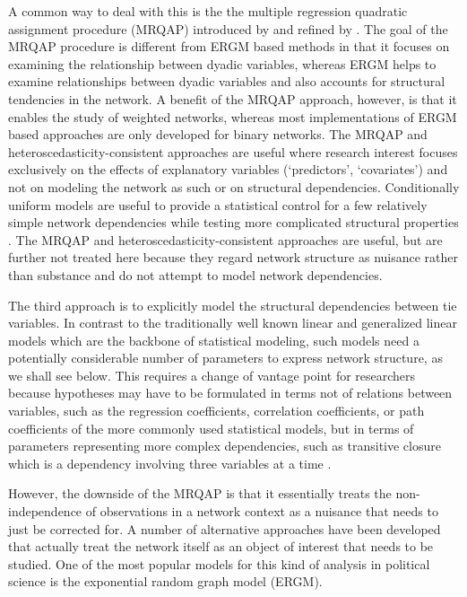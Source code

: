 A common way to deal with this is the the multiple regression quadratic assignment procedure (MRQAP) introduced by \citet{krackhardt:1988} and refined by \citet{dekker:etal:2007}. The goal of the MRQAP procedure is different from ERGM based methods in that it focuses on examining the relationship between dyadic variables, whereas ERGM helps to examine relationships between dyadic variables and also accounts for structural tendencies in the network. A benefit of the MRQAP approach, however, is that it enables the study of weighted networks, whereas most implementations of ERGM based approaches are only developed for binary networks. The MRQAP and heteroscedasticity-consistent approaches are useful where research interest focuses exclusively on the effects of explanatory variables (`predictors', `covariates') and not on modeling the network as such or on structural dependencies. Conditionally uniform models are useful to provide a statistical control for a few relatively simple network dependencies while testing more complicated structural properties \citep{snijders:2011}. The MRQAP and heteroscedasticity-consistent approaches are useful, but are further not treated here because they regard network structure as nuisance rather than substance and do not attempt to model network dependencies. 

The third approach is to explicitly model the structural dependencies between tie variables. In contrast to the traditionally well known linear and generalized linear models which are the backbone of statistical modeling, such models need a potentially considerable number of parameters to express network structure, as we shall see below. This requires a change of vantage point for researchers because hypotheses may have to be formulated in terms not of relations between variables, such as the regression coefficients, correlation coefficients, or path coefficients of the more commonly used statistical models, but in terms of parameters representing more complex dependencies, such as transitive closure which is a dependency involving three variables at a time \citep{snijders:2011}.

However, the downside of the MRQAP is that it essentially treats the non-independence of observations in a network context as a nuisance that needs to just be corrected for. A number of alternative approaches have been developed that actually treat the network itself as an object of interest that needs to be studied. One of the most popular models for this kind of analysis in political science is the exponential random graph model (ERGM).

